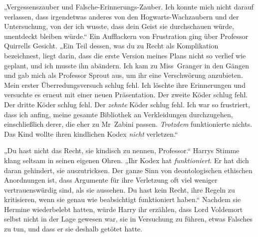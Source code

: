 „Vergessenszauber und Falsche-Erinnerungs-Zauber. Ich konnte mich nicht darauf verlassen, dass irgendetwas anderes von den Hogwarts-Wachzaubern und der Untersuchung, von der ich wusste, dass dein Geist sie durchschauen würde, unentdeckt bleiben würde.“
Ein Aufflackern von Frustration ging über Professor Quirrells Gesicht.
„Ein Teil dessen, was du zu Recht als Komplikation bezeichnest, liegt darin, dass die erste Version meines Plans nicht so verlief wie geplant, und ich musste ihn abändern. Ich kam zu Miss~Granger in den Gängen und gab mich als Professor Sprout aus, um ihr eine Verschwörung anzubieten. Mein erster Überredungsversuch schlug fehl. Ich löschte ihre Erinnerungen und versuchte es erneut mit einer neuen Präsentation. Der zweite Köder schlug fehl. Der dritte Köder schlug fehl. Der \emph{zehnte} Köder schlug fehl. Ich war so frustriert, dass ich anfing, meine gesamte Bibliothek an Verkleidungen durchzugehen, einschließlich derer, die eher zu Mr~Zabini passen. \emph{Trotzdem} funktionierte nichts. Das Kind wollte ihren kindlichen Kodex \emph{nicht} verletzen.“

„Du hast nicht das Recht, sie kindisch zu nennen, Professor.“
Harrys Stimme klang seltsam in seinen eigenen Ohren.
„Ihr Kodex hat \emph{funktioniert}. Er hat dich daran gehindert, sie auszutricksen. Der ganze Sinn von deontologischen ethischen Anordnungen ist, dass Argumente für ihre Verletzung oft viel weniger vertrauenswürdig sind, als sie aussehen. Du hast kein Recht, ihre Regeln zu kritisieren, wenn sie genau wie beabsichtigt funktioniert haben.“
Nachdem sie Hermine wiederbelebt hatten, würde Harry ihr erzählen, dass Lord Voldemort selbst nicht in der Lage gewesen war, sie in Versuchung zu führen, etwas Falsches zu tun, und dass er sie deshalb getötet hatte.

